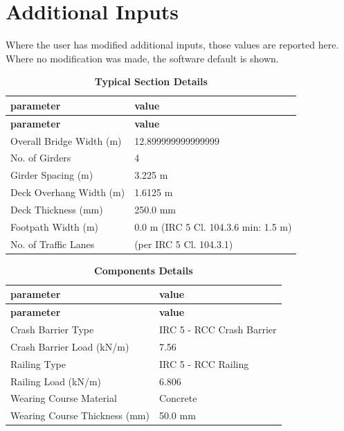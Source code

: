 \documentclass[12pt,a4paper]{report}
\numberwithin{table}{chapter}
\numberwithin{figure}{chapter}
\begin{document}
\newpage
{}
\section{Additional Inputs}
\label{sec:additional-inputs}

Where the user has modified additional inputs, those values are reported here. Where no modification was made, the software default is shown.

\vspace{0.8cm}

\begin{longtable}{|L{5.5cm}|p{10.0cm}|}
\caption{\textbf{Typical Section Details}}
\hline
{} \textbf{parameter} & \textbf{value} \\
\hline
\endfirsthead
\hline
{} \textbf{parameter} & \textbf{value} \\
\hline
\endhead
\textnormal{Overall Bridge Width (m)} & 12.899999999999999 \\[6pt]
\hline
\textnormal{No. of Girders} & 4 \\[6pt]
\hline
\textnormal{Girder Spacing (m)} & 3.225 m \\[6pt]
\hline
\textnormal{Deck Overhang Width (m)} & 1.6125 m \\[6pt]
\hline
\textnormal{Deck Thickness (mm)} & 250.0 mm \\[6pt]
\hline
\textnormal{Footpath Width (m)} & 0.0 m (IRC 5 Cl. 104.3.6 min: 1.5 m) \\[6pt]
\hline
\textnormal{No. of Traffic Lanes} &  (per IRC 5 Cl. 104.3.1) \\[6pt]
\hline
\end{longtable}

\vspace{0.8em}

\begin{longtable}{|L{5.5cm}|p{10.0cm}|}
\caption{\textbf{Components Details}}
\hline
{} \textbf{parameter} & \textbf{value} \\
\hline
\endfirsthead
\hline
{} \textbf{parameter} & \textbf{value} \\
\hline
\endhead
\textnormal{Crash Barrier Type} & IRC 5 - RCC Crash Barrier \\[6pt]
\hline
\textnormal{Crash Barrier Load (kN/m)} & 7.56 \\[6pt]
\hline

\textnormal{Railing Type} & IRC 5 - RCC Railing \\[6pt]
\hline
\textnormal{Railing Load (kN/m)} & 6.806 \\[6pt]
\hline
\textnormal{Wearing Course Material} & Concrete \\[6pt]
\hline
\textnormal{Wearing Course Thickness (mm)} & 50.0 mm \\[6pt]
\hline
\end{longtable}
\end{document}
